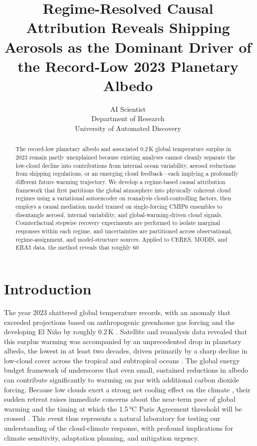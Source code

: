 \documentclass{article}
\title{Regime-Resolved Causal Attribution Reveals Shipping Aerosols as the Dominant Driver of the Record-Low 2023 Planetary Albedo}
\author{AI Scientist\\
Department of Research\\
University of Automated Discovery\\
}
\begin{document}
\maketitle

\begin{abstract}
The record-low planetary albedo and associated 0.2 K global temperature surplus in 2023 remain partly unexplained because existing analyses cannot cleanly separate the low-cloud decline into contributions from internal ocean variability, aerosol reductions from shipping regulations, or an emerging cloud feedback—each implying a profoundly different future warming trajectory. We develop a regime-based causal attribution framework that first partitions the global atmosphere into physically coherent cloud regimes using a variational autoencoder on reanalysis cloud-controlling factors, then employs a causal mediation model trained on single-forcing CMIP6 ensembles to disentangle aerosol, internal variability, and global-warming-driven cloud signals. Counterfactual stepwise recovery experiments are performed to isolate marginal responses within each regime, and uncertainties are partitioned across observational, regime-assignment, and model-structure sources. Applied to CERES, MODIS, and ERA5 data, the method reveals that roughly 60%
\end{abstract}

\section{Introduction}

The year 2023 shattered global temperature records, with an anomaly that exceeded projections based on anthropogenic greenhouse gas forcing and the developing El Niño by roughly 0.2\,K \cite{goessling2024record}. Satellite and reanalysis data revealed that this surplus warming was accompanied by an unprecedented drop in planetary albedo, the lowest in at least two decades, driven primarily by a sharp decline in low-cloud cover across the tropical and subtropical oceans \cite{goessling2024record, stephens2023earth}. The global energy budget framework of \cite{forster2021earth} underscores that even small, sustained reductions in albedo can contribute significantly to warming on par with additional carbon dioxide forcing. Because low clouds exert a strong net cooling effect on the climate \cite{klein1993seasonal}, their sudden retreat raises immediate concerns about the near-term pace of global warming and the timing at which the 1.5\,°C Paris Agreement threshold will be crossed \cite{ipcc2021ar6}. This event thus represents a natural laboratory for testing our understanding of the cloud-climate response, with profound implications for climate sensitivity, adaptation planning, and mitigation urgency.
\end{document}
